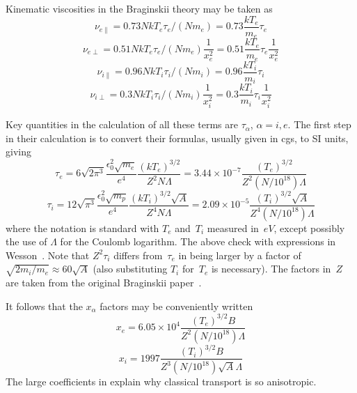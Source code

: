 Kinematic viscosities in the Braginskii theory may be taken as
\begin{equation}\label{eq:nuparae}
\nu_{e\|}= 0.73 NkT_e \tau_e /(N m_e) = 0.73 \frac{kT_e}{m_e} \tau_e
\end{equation}
\begin{equation}\label{eq:nuperpe}
\nu_{e\perp}= 0.51 NkT_e \tau_e /(N m_e) \frac{1}{x_e^2}= 0.51 \frac{kT_e}{m_e} \tau_e\frac{1}{x_e^2}
\end{equation}
\begin{equation}\label{eq:nuparai}
\nu_{i\|}= 0.96 NkT_i \tau_i /(N m_i) = 0.96 \frac{kT_i}{m_i} \tau_i
\end{equation}
\begin{equation}\label{eq:nuperpi}
\nu_{i\perp}= 0.3 NkT_i \tau_i  /(N m_i)\frac{1}{x_i^2} = 0.3 \frac{kT_i}{m_i} \tau_i\frac{1}{x_i^2}
\end{equation}


Key quantities in the calculation of all these terms are $\tau_\alpha$, $\alpha=i,e$.
The first step in their calculation is to convert their formulas,
usually given in cgs, to SI units, giving
\begin{equation}\label{eq:tauesi}
\tau_e=6 \sqrt{2\pi^3} \frac{\epsilon_0^2\sqrt{m_e}}{e^4} \frac{(kT_e)^{3/2}}{Z^2 N \Lambda}
=3.44 \times 10^{-7} \frac{(T_e)^{3/2}}{Z^2 (N/10^{18}) \Lambda}
\end{equation}
\begin{equation}\label{eq:tauisi}
\tau_i=12 \sqrt{\pi^3} \frac{\epsilon_0^2\sqrt{m_p}}{e^4} \frac{(kT_i)^{3/2} \sqrt{A}}{Z^4 N \Lambda}
=2.09 \times 10^{-5} \frac{(T_i)^{3/2} \sqrt{A}}{Z^4 (N/10^{18}) \Lambda}
\end{equation}
where the notation is standard with $T_e$ and~$T_i$  measured in~$eV$, except possibly the use of $\Lambda$ for
the Coulomb logarithm. The above check with expressions in Wesson~\cite[\S\,14]{wesson}.
Note that $Z^2 \tau_i$ differs from~$\tau_e$ in being larger by  a factor of $\sqrt{2m_i/m_e}\approx 60 \sqrt{A}$
(also substituting $T_i$ for~$T_e$ is necessary). The factors in~$Z$ are taken from the
original Braginskii paper~\cite{Br65Tranwarv}.

It follows that the $x_\alpha$ factors may be conveniently written
\begin{equation}\label{eq:xen}
x_e =6.05 \times 10^{4} \frac{(T_e)^{3/2} B}{Z^2 (N/10^{18}) \Lambda}
\end{equation}
\begin{equation}\label{eq:xin}
x_i =1997 \frac{(T_i)^{3/2} B}{Z^3 (N/10^{18}) \sqrt{A} \Lambda}
\end{equation}
The large coefficients in  explain why classical transport is
so anisotropic.

